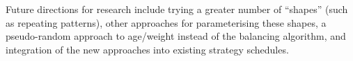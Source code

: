 \documentclass{llncs}
\begin{document}
Future directions for research include trying a greater number of ``shapes'' (such as repeating patterns), other approaches for parameterising these shapes, a pseudo-random approach to age/weight instead of the balancing algorithm, and integration of the new approaches into existing strategy schedules.


\end{document}

